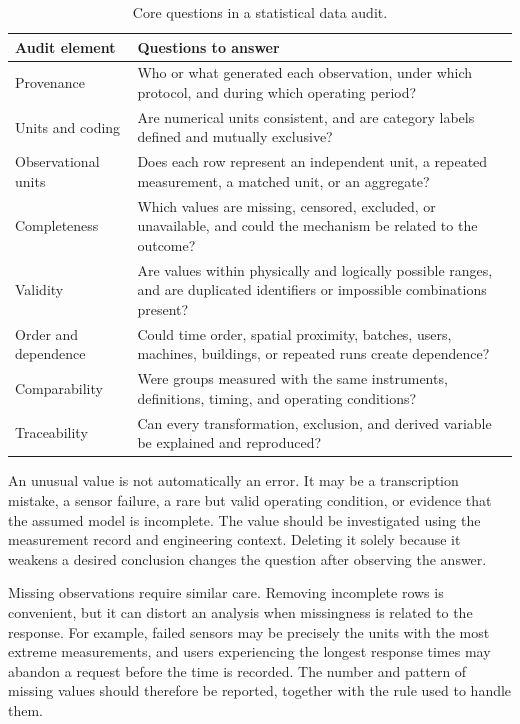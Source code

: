 \begin{table}[htbp]
\centering
\caption{Core questions in a statistical data audit.}
\label{tab:integrated-data-audit}
\begin{tabularx}{\textwidth}{@{}l>{\raggedright\arraybackslash}X@{}}
\toprule
Audit element & Questions to answer \\
\midrule
Provenance & Who or what generated each observation, under which protocol, and during which operating period? \\
Units and coding & Are numerical units consistent, and are category labels defined and mutually exclusive? \\
Observational units & Does each row represent an independent unit, a repeated measurement, a matched unit, or an aggregate? \\
Completeness & Which values are missing, censored, excluded, or unavailable, and could the mechanism be related to the outcome? \\
Validity & Are values within physically and logically possible ranges, and are duplicated identifiers or impossible combinations present? \\
Order and dependence & Could time order, spatial proximity, batches, users, machines, buildings, or repeated runs create dependence? \\
Comparability & Were groups measured with the same instruments, definitions, timing, and operating conditions? \\
Traceability & Can every transformation, exclusion, and derived variable be explained and reproduced? \\
\bottomrule
\end{tabularx}
\end{table}

\FloatBarrier

An unusual value is not automatically an error. It may be a transcription mistake, a sensor failure, a rare but valid operating condition, or evidence that the assumed model is incomplete. The value should be investigated using the measurement record and engineering context. Deleting it solely because it weakens a desired conclusion changes the question after observing the answer.

Missing observations require similar care. Removing incomplete rows is convenient, but it can distort an analysis when missingness is related to the response. For example, failed sensors may be precisely the units with the most extreme measurements, and users experiencing the longest response times may abandon a request before the time is recorded. The number and pattern of missing values should therefore be reported, together with the rule used to handle them.

